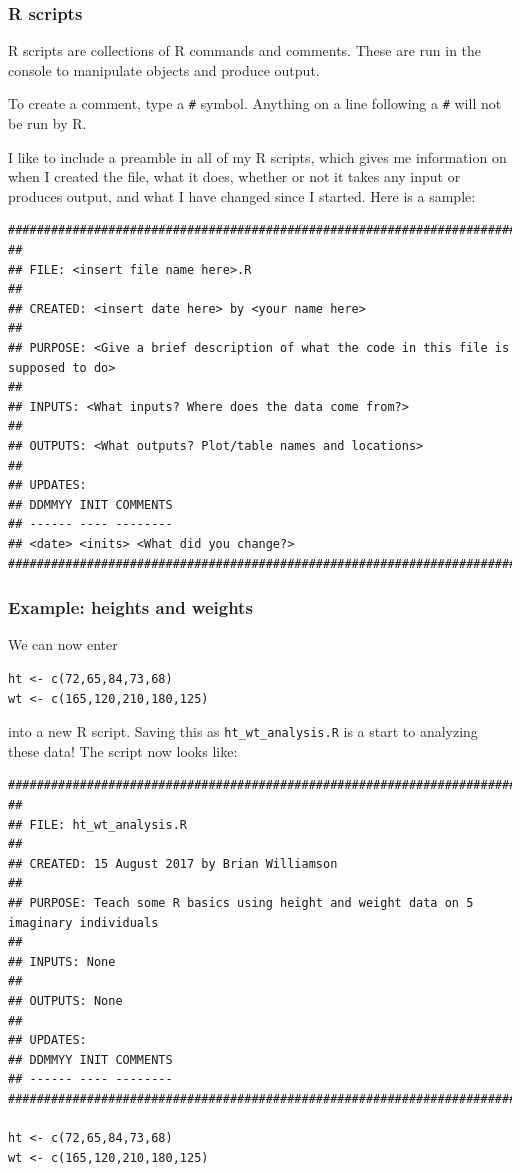 \documentclass[11pt]{beamer}
\begin{document}
\begin{frame}[fragile]
\frametitle{R scripts}
R scripts are collections of R commands and comments. These are run in the console to manipulate objects and produce output.

To create a comment, type a \texttt{\#} symbol. Anything on a line following a \texttt{\#} will not be run by R.

I like to include a preamble in all of my R scripts, which gives me information on when I created the file, what it does, whether or not it takes any input or produces output, and what I have changed since I started. Here is a sample:
\fontsize{7pt}{7.2}\selectfont
\begin{verbatim}
##############################################################################################
##
## FILE: <insert file name here>.R
##
## CREATED: <insert date here> by <your name here>
##
## PURPOSE: <Give a brief description of what the code in this file is supposed to do>
##
## INPUTS: <What inputs? Where does the data come from?>
##
## OUTPUTS: <What outputs? Plot/table names and locations>
##
## UPDATES:
## DDMMYY INIT COMMENTS
## ------ ---- --------
## <date> <inits> <What did you change?>
##############################################################################################
\end{verbatim}
\end{frame}

\begin{frame}[fragile]
\frametitle{Example: heights and weights}
We can now enter 
\begin{verbatim}
ht <- c(72,65,84,73,68)
wt <- c(165,120,210,180,125)
\end{verbatim}
into a new R script. Saving this as \texttt{ht\_wt\_analysis.R} is a start to analyzing these data! The script now looks like:
\tiny
\begin{verbatim}
##############################################################################################
##
## FILE: ht_wt_analysis.R
##
## CREATED: 15 August 2017 by Brian Williamson
##
## PURPOSE: Teach some R basics using height and weight data on 5 imaginary individuals
##
## INPUTS: None
##
## OUTPUTS: None
##
## UPDATES:
## DDMMYY INIT COMMENTS
## ------ ---- --------
##############################################################################################

ht <- c(72,65,84,73,68)
wt <- c(165,120,210,180,125)
\end{verbatim}
\end{frame}
\end{document}
